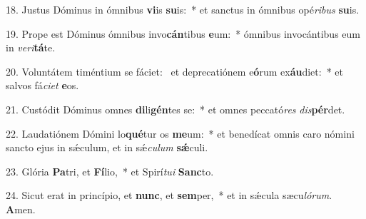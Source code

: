 18. Justus Dóminus in ómnibus \textbf{vi}is \textbf{su}is:~*  et sanctus in ómnibus opé\textit{ri}\textit{bus} \textbf{su}is.\

19. Prope est Dóminus ómnibus invo\textbf{cán}tibus \textbf{e}um:~*  ómnibus invocántibus eum in \textit{ve}\textit{ri}\textbf{tá}te.\

20. Voluntátem timéntium se fáciet: \dag\  et deprecatiónem e\textbf{ó}rum ex\textbf{áu}diet:~*  et salvos fá\textit{ci}\textit{et} \textbf{e}os.\

21. Custódit Dóminus omnes \textbf{di}li\textbf{gén}tes se:~*  et omnes peccató\textit{res} \textit{dis}\textbf{pér}det.\

22. Laudatiónem Dómini lo\textbf{qué}tur os \textbf{me}um:~*  et benedícat omnis caro nómini sancto ejus in sǽculum, et in sǽ\textit{cu}\textit{lum} \textbf{sǽ}culi.\

23. Glória \textbf{Pa}tri, et \textbf{Fí}lio,~*  et Spirí\textit{tu}\textit{i} \textbf{Sanc}to.\

24. Sicut erat in princípio, et \textbf{nunc}, et \textbf{sem}per,~*  et in sǽcula sæcu\textit{ló}\textit{rum}. \textbf{A}men.\

